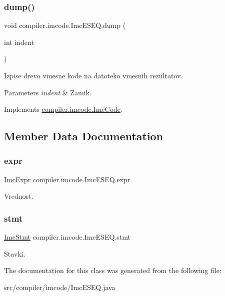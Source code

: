 \subsubsection{\texorpdfstring{dump()}{dump()}}
{\footnotesize\ttfamily void compiler.\+imcode.\+Imc\+E\+S\+E\+Q.\+dump (\begin{DoxyParamCaption}\item[{int}]{indent }\end{DoxyParamCaption})}

Izpise drevo vmesne kode na datoteko vmesnih rezultatov.


\begin{DoxyParams}{Parameters}
{\em indent} & Zamik. \\
\hline
\end{DoxyParams}


Implements \hyperlink{interfacecompiler_1_1imcode_1_1_imc_code_a26451dea2ab4dbd7054ac33f4c6d71fe}{compiler.\+imcode.\+Imc\+Code}.



\subsection{Member Data Documentation}
\mbox{\label{classcompiler_1_1imcode_1_1_imc_e_s_e_q_a5a738c2d0d2b3c8f75acb4dc718bc9cd}} 
\subsubsection{\texorpdfstring{expr}{expr}}
{\footnotesize\ttfamily \hyperlink{classcompiler_1_1imcode_1_1_imc_expr}{Imc\+Expr} compiler.\+imcode.\+Imc\+E\+S\+E\+Q.\+expr}

Vrednost. \mbox{\label{classcompiler_1_1imcode_1_1_imc_e_s_e_q_afb69f3ce55e9a9990f3ae53028eef7a4}} 
\subsubsection{\texorpdfstring{stmt}{stmt}}
{\footnotesize\ttfamily \hyperlink{classcompiler_1_1imcode_1_1_imc_stmt}{Imc\+Stmt} compiler.\+imcode.\+Imc\+E\+S\+E\+Q.\+stmt}

Stavki. 

The documentation for this class was generated from the following file\+:\begin{DoxyCompactItemize}
\item 
src/compiler/imcode/Imc\+E\+S\+E\+Q.\+java\end{DoxyCompactItemize}
